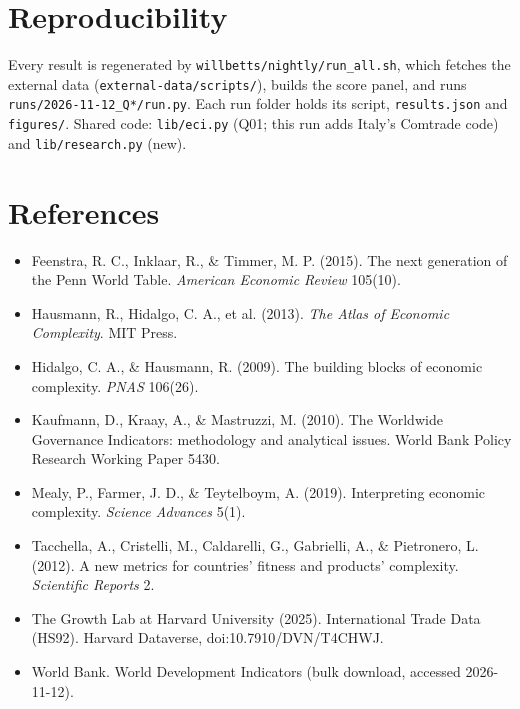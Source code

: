 \documentclass[11pt]{article}
\begin{document}
\section*{Reproducibility}
Every result is regenerated by \texttt{willbetts/nightly/run\_all.sh}, which fetches the external data (\texttt{external-data/scripts/}), builds the score panel, and runs \texttt{runs/2026-11-12\_Q*/run.py}. Each run folder holds its script, \texttt{results.json} and \texttt{figures/}. Shared code: \texttt{lib/eci.py} (Q01; this run adds Italy's Comtrade code) and \texttt{lib/research.py} (new).

\section*{References}
\small
\begin{itemize}[leftmargin=*,label={}]
\item Feenstra, R. C., Inklaar, R., \& Timmer, M. P. (2015). The next generation of the Penn World Table. \emph{American Economic Review} 105(10).
\item Hausmann, R., Hidalgo, C. A., et al. (2013). \emph{The Atlas of Economic Complexity}. MIT Press.
\item Hidalgo, C. A., \& Hausmann, R. (2009). The building blocks of economic complexity. \emph{PNAS} 106(26).
\item Kaufmann, D., Kraay, A., \& Mastruzzi, M. (2010). The Worldwide Governance Indicators: methodology and analytical issues. World Bank Policy Research Working Paper 5430.
\item Mealy, P., Farmer, J. D., \& Teytelboym, A. (2019). Interpreting economic complexity. \emph{Science Advances} 5(1).
\item Tacchella, A., Cristelli, M., Caldarelli, G., Gabrielli, A., \& Pietronero, L. (2012). A new metrics for countries' fitness and products' complexity. \emph{Scientific Reports} 2.
\item The Growth Lab at Harvard University (2025). International Trade Data (HS92). Harvard Dataverse, doi:10.7910/DVN/T4CHWJ.
\item World Bank. World Development Indicators (bulk download, accessed 2026-11-12).
\end{itemize}
\end{document}
